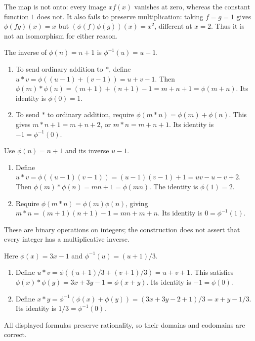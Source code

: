 
The map is not onto: every image $x f(x)$ vanishes at zero, whereas the constant function $1$ does not. It also fails to preserve multiplication: taking $f=g=1$ gives $\phi(fg)(x)=x$ but $(\phi(f)\phi(g))(x)=x^2$, different at $x=2$. Thus it is not an isomorphism for either reason.


The inverse of $\phi(n)=n+1$ is $\phi^{-1}(u)=u-1$.
\begin{enumerate}[label=(\alph*)]
\item To send ordinary addition to $*$, define $u*v=\phi((u-1)+(v-1))=u+v-1$. Then $\phi(m)*\phi(n)=(m+1)+(n+1)-1=m+n+1=\phi(m+n)$. Its identity is $\phi(0)=1$.
\item To send $*$ to ordinary addition, require $\phi(m*n)=\phi(m)+\phi(n)$. This gives $m*n+1=m+n+2$, or $m*n=m+n+1$. Its identity is $-1=\phi^{-1}(0)$.
\end{enumerate}


Use $\phi(n)=n+1$ and its inverse $u-1$.
\begin{enumerate}[label=(\alph*)]
\item Define $u*v=\phi((u-1)(v-1))=(u-1)(v-1)+1=uv-u-v+2$. Then $\phi(m)*\phi(n)=mn+1=\phi(mn)$. The identity is $\phi(1)=2$.
\item Require $\phi(m*n)=\phi(m)\phi(n)$, giving $m*n=(m+1)(n+1)-1=mn+m+n$. Its identity is $0=\phi^{-1}(1)$.
\end{enumerate}
These are binary operations on integers; the construction does not assert that every integer has a multiplicative inverse.


Here $\phi(x)=3x-1$ and $\phi^{-1}(u)=(u+1)/3$.
\begin{enumerate}[label=(\alph*)]
\item Define $u*v=\phi((u+1)/3+(v+1)/3)=u+v+1$. This satisfies $\phi(x)*\phi(y)=3x+3y-1=\phi(x+y)$. Its identity is $-1=\phi(0)$.
\item Define $x*y=\phi^{-1}(\phi(x)+\phi(y))=(3x+3y-2+1)/3=x+y-1/3$. Its identity is $1/3=\phi^{-1}(0)$.
\end{enumerate}
All displayed formulas preserve rationality, so their domains and codomains are correct.

